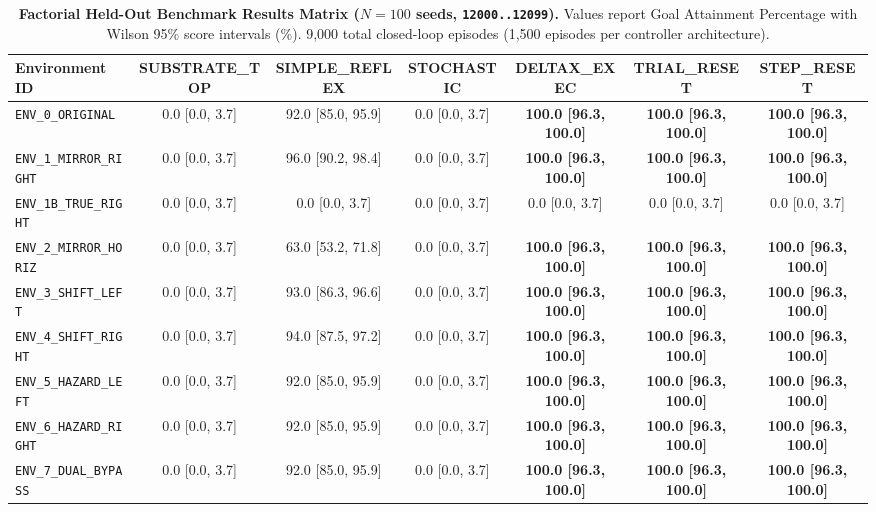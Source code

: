 \documentclass[10pt,letterpaper]{article}
\begin{document}
\begin{table}[t]
\centering
\small
\caption{\textbf{Factorial Held-Out Benchmark Results Matrix ($N = 100$ seeds, \texttt{12000..12099}).} Values report Goal Attainment Percentage with Wilson 95\% score intervals (\%). 9,000 total closed-loop episodes (1,500 episodes per controller architecture).}
\label{tab:factorial_matrix}
\begin{tabular*}{\textwidth}{@{\extracolsep{\fill}}lcccccc@{}}
\toprule
\textbf{Environment ID} & \textbf{SUBSTRATE\_TOP} & \textbf{SIMPLE\_REFLEX} & \textbf{STOCHASTIC} & \textbf{DELTAX\_EXEC} & \textbf{TRIAL\_RESET} & \textbf{STEP\_RESET} \\
\midrule
\texttt{ENV\_0\_ORIGINAL} & 0.0 [0.0, 3.7] & 92.0 [85.0, 95.9] & 0.0 [0.0, 3.7] & \textbf{100.0 [96.3, 100.0]} & \textbf{100.0 [96.3, 100.0]} & \textbf{100.0 [96.3, 100.0]} \\
\texttt{ENV\_1\_MIRROR\_RIGHT} & 0.0 [0.0, 3.7] & 96.0 [90.2, 98.4] & 0.0 [0.0, 3.7] & \textbf{100.0 [96.3, 100.0]} & \textbf{100.0 [96.3, 100.0]} & \textbf{100.0 [96.3, 100.0]} \\
\texttt{ENV\_1B\_TRUE\_RIGHT} & 0.0 [0.0, 3.7] & 0.0 [0.0, 3.7] & 0.0 [0.0, 3.7] & 0.0 [0.0, 3.7] & 0.0 [0.0, 3.7] & 0.0 [0.0, 3.7] \\
\texttt{ENV\_2\_MIRROR\_HORIZ} & 0.0 [0.0, 3.7] & 63.0 [53.2, 71.8] & 0.0 [0.0, 3.7] & \textbf{100.0 [96.3, 100.0]} & \textbf{100.0 [96.3, 100.0]} & \textbf{100.0 [96.3, 100.0]} \\
\texttt{ENV\_3\_SHIFT\_LEFT} & 0.0 [0.0, 3.7] & 93.0 [86.3, 96.6] & 0.0 [0.0, 3.7] & \textbf{100.0 [96.3, 100.0]} & \textbf{100.0 [96.3, 100.0]} & \textbf{100.0 [96.3, 100.0]} \\
\texttt{ENV\_4\_SHIFT\_RIGHT} & 0.0 [0.0, 3.7] & 94.0 [87.5, 97.2] & 0.0 [0.0, 3.7] & \textbf{100.0 [96.3, 100.0]} & \textbf{100.0 [96.3, 100.0]} & \textbf{100.0 [96.3, 100.0]} \\
\texttt{ENV\_5\_HAZARD\_LEFT} & 0.0 [0.0, 3.7] & 92.0 [85.0, 95.9] & 0.0 [0.0, 3.7] & \textbf{100.0 [96.3, 100.0]} & \textbf{100.0 [96.3, 100.0]} & \textbf{100.0 [96.3, 100.0]} \\
\texttt{ENV\_6\_HAZARD\_RIGHT} & 0.0 [0.0, 3.7] & 92.0 [85.0, 95.9] & 0.0 [0.0, 3.7] & \textbf{100.0 [96.3, 100.0]} & \textbf{100.0 [96.3, 100.0]} & \textbf{100.0 [96.3, 100.0]} \\
\texttt{ENV\_7\_DUAL\_BYPASS} & 0.0 [0.0, 3.7] & 92.0 [85.0, 95.9] & 0.0 [0.0, 3.7] & \textbf{100.0 [96.3, 100.0]} & \textbf{100.0 [96.3, 100.0]} & \textbf{100.0 [96.3, 100.0]} \\

\end{tabular*}
\end{table}
\end{document}

